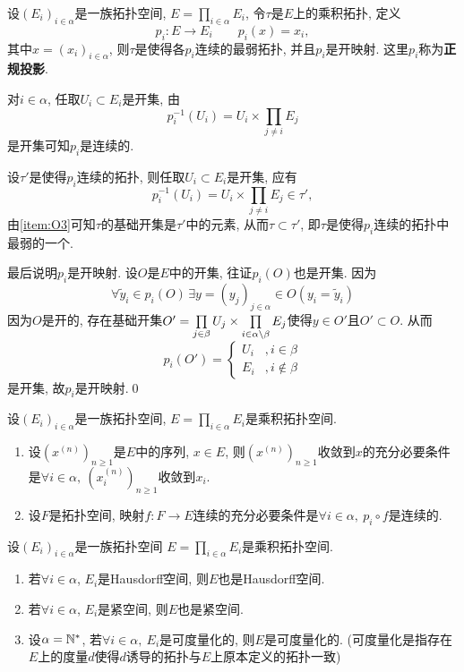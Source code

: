 	\begin{Theorem}
	设$ (E_i)_{i\in\alpha} $是一族拓扑空间, $ E=\prod_{i\in\alpha}E_i $, 令$ \tau $是$ E $上的乘积拓扑, 定义
	\[
	p_i : E\to E_i\qquad p_i(x)=x_i,
	\]
	其中$ x=(x_i)_{i\in\alpha} $, 则$ \tau $是使得各$ p_i $连续的最弱拓扑, 并且$ p_i $是开映射. 这里$ p_i $称为\textbf{正规投影}.
	\end{Theorem}
	\begin{Proof}
	对$ i\in\alpha $, 任取$ U_i\subset E_i $是开集, 由
	\[
	p_i^{-1}(U_i)=U_i\times\prod_{j\ne i}E_j
	\]
	是开集可知$ p_i $是连续的.
	
	设$ \tau' $是使得$ p_i $连续的拓扑, 则任取$ U_i\subset E_i $是开集, 应有
	\[
	p_i^{-1}(U_i)=U_i\times\prod_{j\ne i}E_j\in\tau',
	\]
	由\ref{item:O3}可知$ \tau $的基础开集是$ \tau' $中的元素, 从而$ \tau\subset\tau' $, 即$ \tau $是使得$ p_i $连续的拓扑中最弱的一个.
	
	最后说明$ p_i $是开映射. 设$ O $是$ E $中的开集, 往证$ p_i(O) $也是开集. 因为
	\[
	\forall \tilde{y}_i\in p_i(O)\,\exists y=(y_j)_{j\in\alpha}\in O(y_i=\tilde{y}_i)
	\]
	因为$ O $是开的, 存在基础开集$ O'=\prod\limits_{j\in\beta}U_j\times\prod\limits_{i\in\alpha\setminus\beta}E_j $使得$ y\in O' $且$ O'\subset O $. 从而
	\[
	p_i(O')=\begin{cases}
	U_i & ,i\in\beta\\ E_i &, i\notin\beta
	\end{cases}
	\]
	是开集, 故$ p_i $是开映射.\qed
	\end{Proof}
	
	\begin{Corollary}
	设$ (E_i)_{i\in\alpha} $是一族拓扑空间, $ E=\prod\limits_{i\in\alpha}E_i $是乘积拓扑空间.
	\begin{enumerate}[(1)]
	\item 设$ (x^{(n)})_{n\geqslant 1} $是$ E $中的序列, $ x\in E $, 则$ (x^{(n)})_{n\geqslant 1} $收敛到$ x $的充分必要条件是$\forall i\in\alpha,\  (x_i^{(n)})_{n\geqslant 1} $收敛到$ x_i $.
	
	\item 设$ F $是拓扑空间, 映射$ f : F\to E $连续的充分必要条件是$ \forall i\in\alpha,\ p_i\circ f $是连续的.
	\end{enumerate}
	\end{Corollary}
	
	\begin{Proposition}
	设$ (E_i)_{i\in\alpha} $是一族拓扑空间 $ E=\prod\limits_{i\in\alpha}E_i $是乘积拓扑空间.
	\begin{enumerate}[(1)]
	\item 若$ \forall i\in\alpha $, $ E_i $是Hausdorff空间, 则$ E $也是Hausdorff空间.
	
	\item 若$ \forall i\in\alpha $, $ E_i $是紧空间, 则$ E $也是紧空间.
	
	\item 设$ \alpha=\mathbb{N}^\ast $, 若$ \forall i\in\alpha,\ E_i $是可度量化的, 则$ E $是可度量化的. (可度量化是指存在$ E $上的度量$ d $使得$ d $诱导的拓扑与$ E $上原本定义的拓扑一致)
	\end{enumerate}
	\end{Proposition}
	
